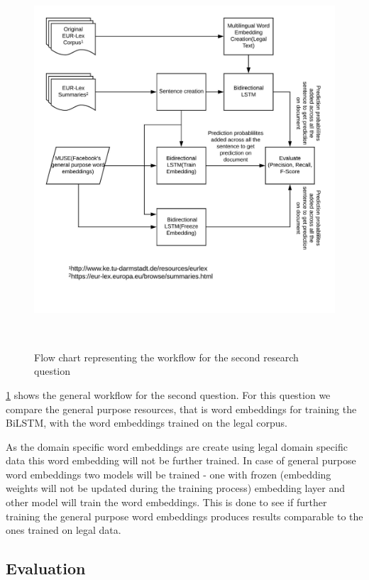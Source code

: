 \begin{figure}[!ht]
    \centering
    \includegraphics[width=15cm, height=14cm,keepaspectratio]{pics/flowforQuestion2.jpeg}
    \caption{Flow chart representing the workflow for the second research question}
    \label{fig:FlowResearchQuestion2}
\end{figure}

\ref{fig:FlowResearchQuestion2} shows the general workflow for the second question. For this question we compare the general purpose resources, that is word embeddings for training the \gls{BiLSTM}, with the word embeddings trained on the legal corpus. 

As the domain specific word embeddings are create using legal domain specific data this word embedding will not be further trained. In case of general purpose word embeddings two models will be trained - one with frozen (embedding weights will not be updated during the training process) embedding layer and other model will train the word embeddings. This is done to see if further training the general purpose word embeddings produces results comparable to the ones trained on legal data.

\subsection*{Evaluation}

